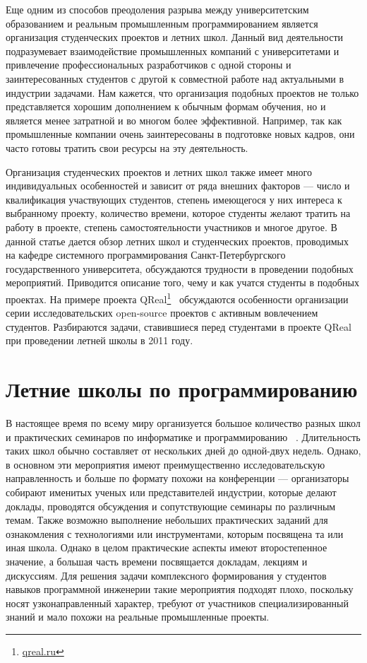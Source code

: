 \documentclass[a4paper]{article}
\begin{document}
Еще одним из способов преодоления разрыва между университетским образованием и реальным промышленным программированием является организация студенческих проектов и летних школ. Данный вид деятельности подразумевает взаимодействие промышленных компаний с университетами и привлечение профессиональных разработчиков с одной стороны и заинтересованных студентов с другой к совместной работе над актуальными в индустрии задачами. Нам кажется, что организация подобных проектов не только представляется хорошим дополнением к обычным формам обучения, но и является менее затратной и во многом более эффективной. Например, так как промышленные компании очень заинтересованы в подготовке новых кадров, они часто готовы тратить свои ресурсы на эту деятельность.

Организация студенческих проектов и летних школ также имеет много индивидуальных особенностей и зависит от ряда внешних факторов --- число и квалификация участвующих студентов, степень имеющегося у них интереса к выбранному проекту, количество времени, которое студенты желают тратить на работу в проекте, степень самостоятельности участников и многое другое. В данной статье дается обзор летних школ и студенческих проектов, проводимых на кафедре системного программирования Санкт-Петербургского государственного университета, обсуждаются трудности в проведении подобных мероприятий. Приводится описание того, чему и как учатся студенты в подобных проектах. На примере проекта QReal\footnote{\url{qreal.ru}}~\cite{qreal2, qreal3, qreal} обсуждаются особенности организации серии исследовательских open-source проектов с активным вовлечением студентов. Разбираются задачи, ставившиеся перед студентами в проекте QReal при проведении летней школы в 2011 году.

\section{Летние школы по программированию}

В настоящее время по всему миру организуется большое количество разных школ и практических семинаров по информатике и программированию ~\cite{schoolList}. Длительность таких школ обычно составляет от нескольких дней до одной-двух недель. Однако, в основном эти мероприятия имеют преимущественно исследовательскую направленность  и больше по формату похожи на конференции --- организаторы собирают именитых ученых или представителей индустрии, которые делают доклады, проводятся обсуждения и сопутствующие семинары по различным темам. Также возможно выполнение небольших практических заданий для ознакомления с технологиями или инструментами, которым посвящена та или иная школа. Однако в целом практические аспекты имеют второстепенное значение, а большая часть времени посвящается докладам, лекциям и дискуссиям. Для решения задачи комплексного формирования у студентов навыков программной инженерии такие мероприятия подходят плохо, поскольку носят узконаправленный характер, требуют от участников специализированный знаний и мало похожи на  реальные промышленные проекты.
\end{document}
